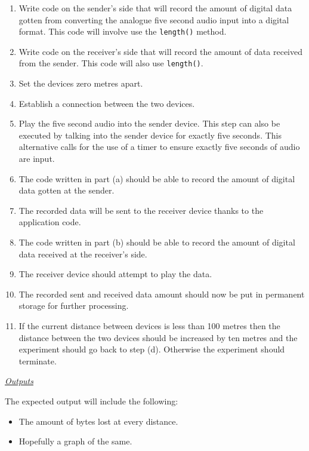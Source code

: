 \documentclass[12pt,svgnames,smaller]{article} %
\begin{document}
\begin{enumerate}
\begin{enumerate}
			\begin{enumerate}
				\item Write code on the sender’s side that will record the amount of digital data gotten from converting the analogue five second audio input into a digital format. This code will involve use the \texttt{length()} method.
				\item Write code on the receiver’s side that will record the amount of data received from the sender. This code will also use \texttt{length()}.
				\item Set the devices zero metres apart.
				\item Establish a connection between the two devices.
				\item Play the five second audio into the sender device. This step can also be executed by talking into the sender device for exactly five seconds. This alternative calls for the use of a timer to ensure exactly five seconds of audio are input.
				\item The code written in part (a) should be able to record the amount of digital data gotten at the sender.
				\item The recorded data will be sent to the receiver device thanks to the application code.
				\item The code written in part (b) should be able to record the amount of digital data received at the receiver’s side.
				\item The receiver device should attempt to play the data. 
				\item The recorded sent and received data amount should now be put in permanent storage for further processing.
				\item If the current distance between devices is less than 100 metres then the distance between the two devices should be increased by ten metres and the experiment should go back to step (d). Otherwise the experiment should terminate. 
			\end{enumerate}
			
			\emph{\underline{\textsf{Outputs}}}
			
			The expected output will include the following:
			
			\begin{itemize}
				\item The amount of bytes lost at every distance.
				\item Hopefully a graph of the same.
			\end{itemize}
			

\end{enumerate}
\end{enumerate}
\end{document}

